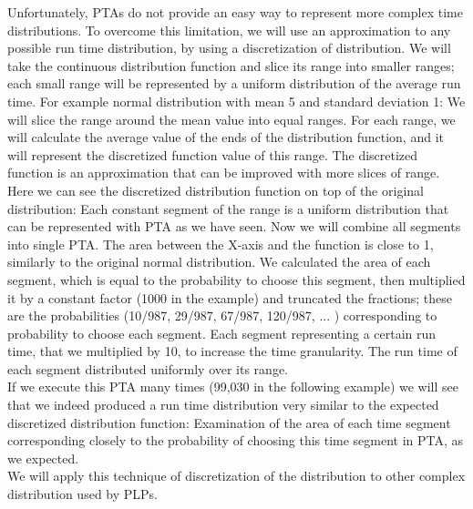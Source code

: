 \par Unfortunately, PTAs do not provide an easy way to represent more complex time distributions. To overcome this limitation, we will use an approximation to any possible run time distribution, by using a discretization of distribution. We will take the continuous distribution function and slice its range into smaller ranges; each small range will be represented by a uniform distribution of the average run time. For example normal distribution with mean 5 and standard deviation 1:  We will slice the range around the mean value into equal ranges. For each range, we will calculate the average value of the ends of the distribution function, and it will represent the discretized function value of this range. The discretized function is an approximation that can be improved with more slices of range. Here we can see the discretized distribution function on top of the original distribution:  Each constant segment of the range is a uniform distribution that can be represented with PTA as we have seen. Now we will combine all segments into single PTA.   The area between the X-axis and the function is close to 1, similarly to the original normal distribution. We calculated the area of each segment, which is equal to the probability to choose this segment, then multiplied it by a constant factor (1000 in the example) and truncated the fractions; these are the probabilities (10/987, 29/987, 67/987, 120/987, ... ) corresponding to probability to choose each segment. Each segment representing a certain run time, that we multiplied by 10, to increase the time granularity. The run time of each segment distributed uniformly over its range.\\
If we execute this PTA many times (99,030 in the following example) we will see that we indeed produced a run time distribution very similar to the expected discretized distribution function:  Examination of the area of each time segment corresponding closely to the probability of choosing this time segment in PTA, as we expected.\\
We will apply this technique of discretization of the distribution to other complex distribution used by PLPs. \\
